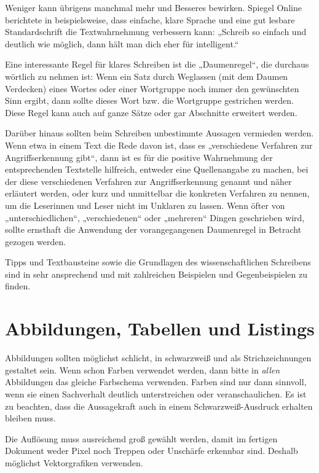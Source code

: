 \documentclass[
    fontsize=12pt,
    headings=small,
    parskip=half,           %
    bibliography=totoc,
    numbers=noenddot,       %
    open=any,               %
    ]{scrreprt}
\begin{document}
Weniger kann übrigens manchmal mehr und Besseres bewirken. Spiegel Online berichtete in \cite{textwahrnehmung} beispielsweise, dass einfache, klare Sprache und eine gut lesbare Standardschrift die Textwahrnehmung verbessern kann: „Schreib so einfach und deutlich wie möglich, dann hält man dich eher für intelligent.“

Eine interessante Regel für klares Schreiben ist die „Daumenregel“, die durchaus wörtlich zu nehmen ist: Wenn ein Satz durch Weglassen (mit dem Daumen Verdecken) eines Wortes oder einer Wortgruppe noch immer den gewünschten Sinn ergibt, dann sollte dieses Wort bzw. die Wortgruppe gestrichen werden. Diese Regel kann auch auf ganze Sätze oder gar Abschnitte erweitert werden.

Darüber hinaus sollten beim Schreiben unbestimmte Aussagen vermieden werden. Wenn etwa in einem Text die Rede davon ist, dass es „verschiedene Verfahren zur Angriffserkennung gibt“, dann ist es für die positive Wahrnehmung der entsprechenden Textstelle hilfreich, entweder eine Quellenangabe zu machen, bei der diese verschiedenen Verfahren zur Angriffserkennung genannt und näher erläutert werden, oder kurz und unmittelbar die konkreten Verfahren zu nennen, um die Leserinnen und Leser nicht im Unklaren zu lassen. Wenn öfter von „unterschiedlichen“, „verschiedenen“ oder „mehreren“ Dingen geschrieben wird, sollte ernsthaft die Anwendung der vorangegangenen Daumenregel in Betracht gezogen werden. 

Tipps und Textbausteine sowie die Grundlagen des wissenschaftlichen Schreibens sind in \cite{Küht2021} sehr ansprechend und mit zahlreichen Beispielen und Gegenbeispielen zu finden.

\section{Abbildungen, Tabellen und Listings}

Abbildungen sollten möglichst schlicht, in schwarzweiß und als Strichzeichnungen gestaltet sein. Wenn schon Farben verwendet werden, dann bitte in \emph{allen} Abbildungen das gleiche Farbschema verwenden. Farben sind nur dann sinnvoll, wenn sie einen Sachverhalt deutlich unterstreichen oder veranschaulichen. Es ist zu beachten, dass die Aussagekraft auch in einem Schwarzweiß-Ausdruck erhalten bleiben muss.

Die Auflösung muss ausreichend groß gewählt werden, damit im fertigen Dokument weder Pixel noch Treppen oder Unschärfe erkennbar sind. Deshalb möglichst Vektorgrafiken verwenden.
\end{document}
